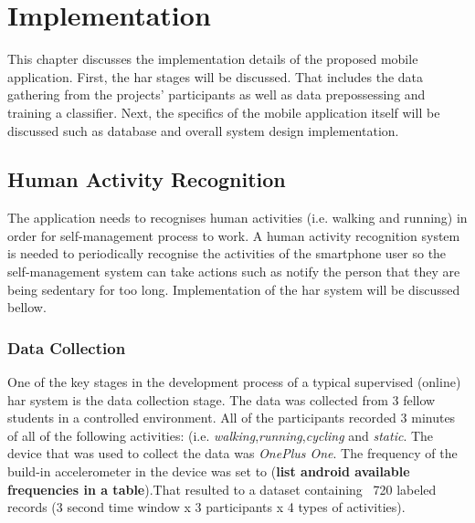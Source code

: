 \chapter{Implementation}
This chapter discusses the implementation details of the proposed mobile application. First, the \gls{har} stages will be discussed. That includes the data gathering from the projects' participants as well as data prepossessing and training a classifier. Next, the specifics of the mobile application itself will be discussed such as database and overall system design implementation.


\section{Human Activity Recognition}
The application needs to recognises human activities (i.e. walking and running) in order for self-management process to work. A human activity recognition system is needed to periodically recognise the activities of the smartphone user so the self-management system can take actions such as notify the person that they are being sedentary for too long. Implementation of the \gls{har} system will be discussed bellow.

    \subsection{Data Collection}
    One of the key stages in the development process of a typical supervised (online) \gls{har} system is the data collection stage. The data was collected from 3 fellow students in a controlled environment. All of the participants recorded 3 minutes of all of the following activities: (i.e. \textit{walking},\textit{running},\textit{cycling} and \textit{static}. The device that was used to collect the data was \textit{OnePlus One}. The frequency of the build-in accelerometer in the device was set to  (\textbf{list android available frequencies in a table}).That resulted to a dataset containing ~720 labeled records (3 second time window x 3 participants x 4 types of activities).